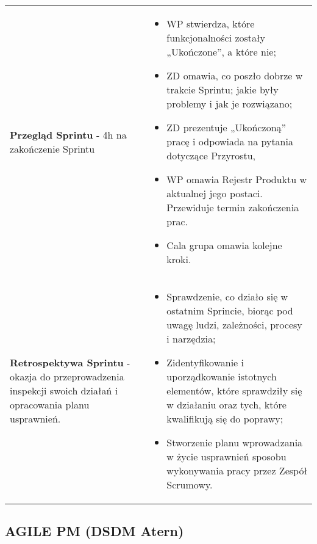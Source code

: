 \documentclass[a4paper]{article}
\begin{document}
\begin{table}[H]
\begin{center}
\begin{tabular}{ p{} p{} }
                \cmidrule(r){1-1}\cmidrule(l){2-2}
                \textbf{Przegląd Sprintu} - 4h na zakończenie Sprintu
                &
                \begin{itemize}
                    \item WP stwierdza, które funkcjonalności zostały
                    „Ukończone”, a które nie;
                    \item ZD omawia, co poszło dobrze w trakcie
                    Sprintu; jakie były problemy i jak je rozwiązano;
                    \item ZD prezentuje „Ukończoną” pracę i
                    odpowiada na pytania dotyczące Przyrostu,
                    \item WP omawia Rejestr Produktu w aktualnej
                    jego postaci. Przewiduje termin zakończenia prac.
                    \item Cala grupa omawia kolejne kroki.
                \end{itemize}
                \\

                \cmidrule(r){1-1}\cmidrule(l){2-2}
                \textbf{Retrospektywa Sprintu} - okazja do przeprowadzenia inspekcji
                swoich działań i opracowania planu usprawnień.
                &
                \begin{itemize}
                    \item Sprawdzenie, co działo się w ostatnim Sprincie, biorąc pod
                    uwagę ludzi, zależności, procesy i narzędzia;
                    \item Zidentyfikowanie i uporządkowanie istotnych elementów, które
                    sprawdziły się w działaniu oraz tych, które kwalifikują się do
                    poprawy;
                    \item Stworzenie planu wprowadzania w życie usprawnień sposobu
                    wykonywania pracy przez Zespół Scrumowy.
                \end{itemize}
                \\
            \end{tabular}
        \end{center}
    \end{table}


    \subsection{AGILE PM (DSDM Atern)}
\end{document}
